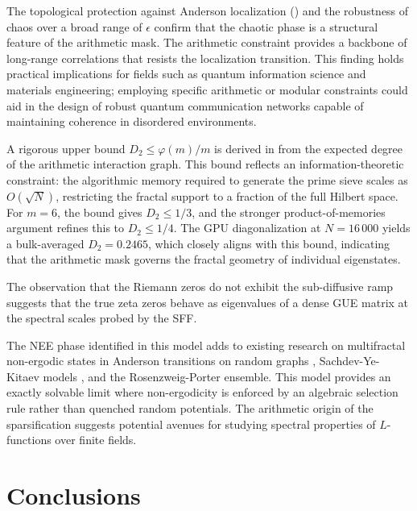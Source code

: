\documentclass[11pt,a4paper]{article}
\begin{document}
The topological protection against Anderson localization () and the robustness of chaos over a broad range of $\epsilon$ confirm that the chaotic phase is a structural feature of the arithmetic mask. The arithmetic constraint provides a backbone of long-range correlations that resists the localization transition. This finding holds practical implications for fields such as quantum information science and materials engineering; employing specific arithmetic or modular constraints could aid in the design of robust quantum communication networks capable of maintaining coherence in disordered environments.

A rigorous upper bound $D_2 \le \varphi(m)/m$ is derived in  from the expected degree of the arithmetic interaction graph. This bound reflects an information-theoretic constraint: the algorithmic memory required to generate the prime sieve scales as $O(\sqrt{N})$, restricting the fractal support to a fraction of the full Hilbert space. For $m=6$, the bound gives $D_2 \le 1/3$, and the stronger product-of-memories argument refines this to $D_2 \le 1/4$. The GPU diagonalization at $N=16\,000$ yields a bulk-averaged $D_2 = 0.2465$, which closely aligns with this bound, indicating that the arithmetic mask governs the fractal geometry of individual eigenstates.

The observation that the Riemann zeros do not exhibit the sub-diffusive ramp suggests that the true zeta zeros behave as eigenvalues of a dense GUE matrix at the spectral scales probed by the SFF. 

The NEE phase identified in this model adds to existing research on multifractal non-ergodic states in Anderson transitions on random graphs \cite{Kravtsov2015}, Sachdev-Ye-Kitaev models \cite{Legramandi2024}, and the Rosenzweig-Porter ensemble. This model provides an exactly solvable limit where non-ergodicity is enforced by an algebraic selection rule rather than quenched random potentials. The arithmetic origin of the sparsification suggests potential avenues for studying spectral properties of $L$-functions over finite fields.

\section{Conclusions}
\label{sec:conclusions}
\end{document}
